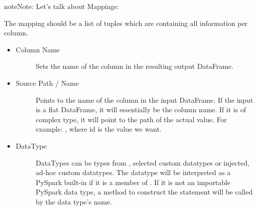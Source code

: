 \documentclass[a4paper,10pt, twoside,english]{sphinxmanual}
\begin{document}
\begin{fulllineitems}
\begin{quote}
\begin{description}
\end{description}\end{quote}

\begin{sphinxadmonition}{note}{Note:}
Let’s talk about Mappings:

The mapping should be a list of tuples which are containing all information per column.
\begin{itemize}
\item {} \begin{description}
\item[{Column Name}] \leavevmode{[}\sphinxhref{https://docs.python.org/2.7/library/functions.html\#str}{\sphinxcode{\sphinxupquote{str}}}{]}
Sets the name of the column in the resulting output DataFrame.

\end{description}

\item {} \begin{description}
\item[{Source Path / Name}] \leavevmode{[}\sphinxhref{https://docs.python.org/2.7/library/functions.html\#str}{\sphinxcode{\sphinxupquote{str}}}{]}
Points to the name of the column in the input DataFrame. If the input
is a flat DataFrame, it will essentially be the column name. If it is of complex
type, it will point to the path of the actual value. For example:
, where id is the value we want.

\end{description}

\item {} \begin{description}
\item[{DataType}] \leavevmode{[}\sphinxhref{https://docs.python.org/2.7/library/functions.html\#str}{\sphinxcode{\sphinxupquote{str}}}{]}
DataTypes can be types from , selected custom datatypes or
injected, ad-hoc custom datatypes.
The datatype will be interpreted as a PySpark built-in if it is a member of .
If it is not an importable PySpark data type, a method to construct the statement will be
called by the data type’s name.

\end{description}

\end{itemize}
\end{sphinxadmonition}


\end{fulllineitems}
\end{document}
